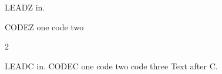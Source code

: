 LEADZ in.
\begin{center}
\endmoddef\nwstartdeflinemarkup\nwenddeflinemarkup
CODEZ one
code two
\nwendcode{}\nwdocspar
\nwenddocs{}
\end{center}

\clearpage
\begin{multicols}{2}

LEADC in.
\endmoddef\nwstartdeflinemarkup\nwenddeflinemarkup
CODEC one
code two
code three
\nwendcode{}\nwdocspar
Text after C.
\nwenddocs{}

\end{multicols}

